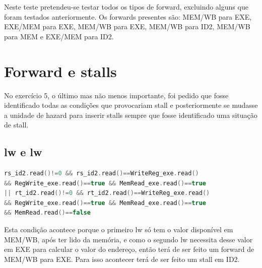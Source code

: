 \documentclass[pdftex,12pt,a4paper]{report}
\begin{document}
Neste teste pretendeu-se testar todos os tipos de forward, excluindo alguns que foram testados anteriormente. Os forwards presentes são: MEM/WB para EXE, EXE/MEM para EXE, MEM/WB para EXE, MEM/WB para ID2, MEM/WB para MEM e EXE/MEM para ID2.

\section{Forward e stalls}

No exercício 5, o último mas não menos importante, foi pedido que fosse identificado todas as condições que provocariam stall e posteriormente se mudasse a unidade de hazard para inserir stalls sempre que fosse identificado uma situação de stall.

\subsection{lw e lw}
\begin{table}[!htb]
\centering
\label{my-label}
\end{table}

\begin{lstlisting}[language = c]
rs_id2.read()!=0 && rs_id2.read()==WriteReg_exe.read() 
&& RegWrite_exe.read()==true && MemRead_exe.read()==true
|| rt_id2.read()!=0 && rt_id2.read()==WriteReg_exe.read() 
&& RegWrite_exe.read()==true && MemRead_exe.read()==true 
&& MemRead.read()==false
\end{lstlisting}

Esta condição acontece porque o primeiro lw só tem o valor disponível em MEM/WB, após ter lido da memória, e como o segundo lw necessita desse valor em EXE para calcular o valor do endereço, então terá de ser feito um forward de MEM/WB para EXE. Para isso acontecer terá de ser feito um stall em ID2.
\end{document}
